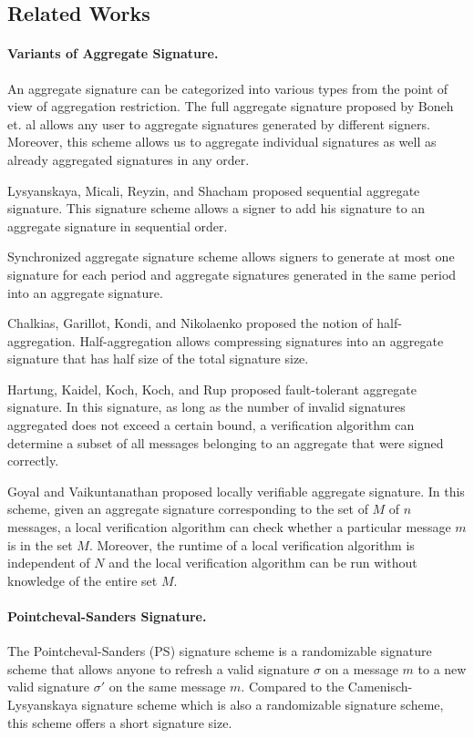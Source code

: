 \documentclass[a4paper,11pt]{fullverllncs}
\begin{document}
\subsection{Related Works}

\paragraph{\bf Variants of Aggregate Signature.}
An aggregate signature can be categorized into various types from the point of view of aggregation restriction.
The full aggregate signature proposed by Boneh et. al \cite{BGLS03} allows any user to aggregate signatures generated by different signers.
Moreover, this scheme allows us to aggregate individual signatures as well as already aggregated signatures in any order.

Lysyanskaya, Micali, Reyzin, and Shacham \cite{LMRS04} proposed sequential aggregate signature.
This signature scheme allows a signer to add his signature to an aggregate signature in sequential order.

Synchronized aggregate signature scheme \cite{GR06,AGH10} allows signers to generate at most one signature for each period and aggregate signatures generated in the same period into an aggregate signature.

Chalkias, Garillot, Kondi, and Nikolaenko \cite{CGKN21} proposed the notion of half-aggregation.
Half-aggregation allows compressing signatures into an aggregate signature that has half size of the total signature size.

Hartung, Kaidel, Koch, Koch, and Rup \cite{HKKKR16} proposed fault-tolerant aggregate signature.
In this signature, as long as the number of invalid signatures aggregated does not exceed a certain bound, a verification algorithm can determine a subset of all messages belonging to an aggregate that were signed correctly. 

Goyal and Vaikuntanathan \cite{GV22} proposed locally verifiable aggregate signature. 
In this scheme, given an aggregate signature corresponding to the set of $M$ of $n$ messages, a local verification algorithm can check whether a particular message $m$ is in the set $M$.
Moreover, the runtime of a local verification algorithm is independent of $N$ and the local verification algorithm can be run without knowledge of the entire set $M$.


\paragraph{\bf Pointcheval-Sanders Signature.}
The Pointcheval-Sanders (PS) signature scheme \cite{PS16} is a randomizable signature scheme that allows anyone to refresh a valid signature $\sigma$ on a message $m$ to a new valid signature $\sigma'$ on the same message $m$.
Compared to the Camenisch-Lysyanskaya signature scheme \cite{CL04} which is also a randomizable signature scheme, this scheme offers a short signature size.
\end{document}
